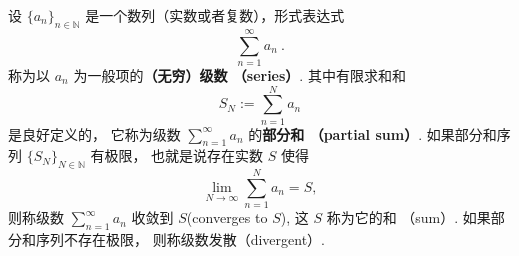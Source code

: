 


设 $\{a_n\}_{n\in\mathbb{N}}$ 是一个数列（实数或者复数），形式表达式
\[
\sum_{n=1}^\infty a_n~.
\]
称为以 $a_n$ 为一般项的\textbf{（无穷）级数 （series）}. 其中有限求和和
\[
S_N:=\sum_{n=1}^N a_n
\]
是良好定义的， 它称为级数 $\sum_{n=1}^\infty a_n$ 的\textbf{部分和 （partial sum）}. 如果部分和序列 $\{S_N\}_{N\in\mathbb{N}}$ 有极限， 也就是说存在实数 $S$ 使得
\[
\lim_{N\to\infty}\sum_{n=1}^N a_n=S,
\] 
则称级数 $\sum_{n=1}^\infty a_n$ 收敛到 $S$(converges to $S$), 这 $S$ 称为它的和 （sum）. 如果部分和序列不存在极限， 则称级数发散（divergent）. 

